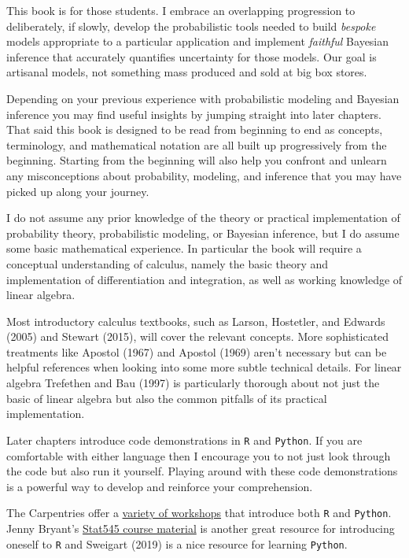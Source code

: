 \documentclass[
  letterpaper,
  DIV=11,
  numbers=noendperiod]{scrartcl}
\begin{document}
This book is for those students. I embrace an overlapping progression to
deliberately, if slowly, develop the probabilistic tools needed to build
\emph{bespoke} models appropriate to a particular application and
implement \emph{faithful} Bayesian inference that accurately quantifies
uncertainty for those models. Our goal is artisanal models, not
something mass produced and sold at big box stores.

Depending on your previous experience with probabilistic modeling and
Bayesian inference you may find useful insights by jumping straight into
later chapters. That said this book is designed to be read from
beginning to end as concepts, terminology, and mathematical notation are
all built up progressively from the beginning. Starting from the
beginning will also help you confront and unlearn any misconceptions
about probability, modeling, and inference that you may have picked up
along your journey.

I do not assume any prior knowledge of the theory or practical
implementation of probability theory, probabilistic modeling, or
Bayesian inference, but I do assume some basic mathematical experience.
In particular the book will require a conceptual understanding of
calculus, namely the basic theory and implementation of differentiation
and integration, as well as working knowledge of linear algebra.

Most introductory calculus textbooks, such as Larson, Hostetler, and
Edwards (2005) and Stewart (2015), will cover the relevant concepts.
More sophisticated treatments like Apostol (1967) and Apostol (1969)
aren't necessary but can be helpful references when looking into some
more subtle technical details. For linear algebra Trefethen and Bau
(1997) is particularly thorough about not just the basic of linear
algebra but also the common pitfalls of its practical implementation.

Later chapters introduce code demonstrations in \texttt{R} and
\texttt{Python}. If you are comfortable with either language then I
encourage you to not just look through the code but also run it
yourself. Playing around with these code demonstrations is a powerful
way to develop and reinforce your comprehension.

The Carpentries offer a
\href{https://carpentries.org/workshops-curricula/\#swc-all}{variety of
workshops} that introduce both \texttt{R} and \texttt{Python}. Jenny
Bryant's \href{https://stat545.com}{Stat545 course material} is another
great resource for introducing oneself to \texttt{R} and Sweigart (2019)
is a nice resource for learning \texttt{Python}.
\end{document}
